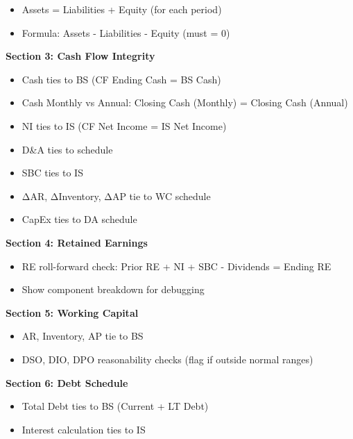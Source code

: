 \documentclass[11pt]{article}
\begin{document}
\begin{itemize}[leftmargin=*,itemsep=2pt,topsep=2pt]
\item {} Assets = Liabilities + Equity (for each period)
\item {} Formula: Assets - Liabilities - Equity (must = 0)
\end{itemize}

\textbf{Section 3: Cash Flow Integrity}

\begin{itemize}[leftmargin=*,itemsep=2pt,topsep=2pt]
\item {} Cash ties to BS (CF Ending Cash = BS Cash)
\item {} Cash Monthly vs Annual: Closing Cash (Monthly) = Closing Cash (Annual)
\item {} NI ties to IS (CF Net Income = IS Net Income)
\item {} D\&A ties to schedule
\item {} SBC ties to IS
\item {} ΔAR, ΔInventory, ΔAP tie to WC schedule
\item {} CapEx ties to DA schedule
\end{itemize}

\textbf{Section 4: Retained Earnings}

\begin{itemize}[leftmargin=*,itemsep=2pt,topsep=2pt]
\item {} RE roll-forward check: Prior RE + NI + SBC - Dividends = Ending RE
\item {} Show component breakdown for debugging
\end{itemize}

\textbf{Section 5: Working Capital}

\begin{itemize}[leftmargin=*,itemsep=2pt,topsep=2pt]
\item {} AR, Inventory, AP tie to BS
\item {} DSO, DIO, DPO reasonability checks (flag if outside normal ranges)
\end{itemize}

\textbf{Section 6: Debt Schedule}

\begin{itemize}[leftmargin=*,itemsep=2pt,topsep=2pt]
\item {} Total Debt ties to BS (Current + LT Debt)
\item {} Interest calculation ties to IS
\end{itemize}
\end{document}

